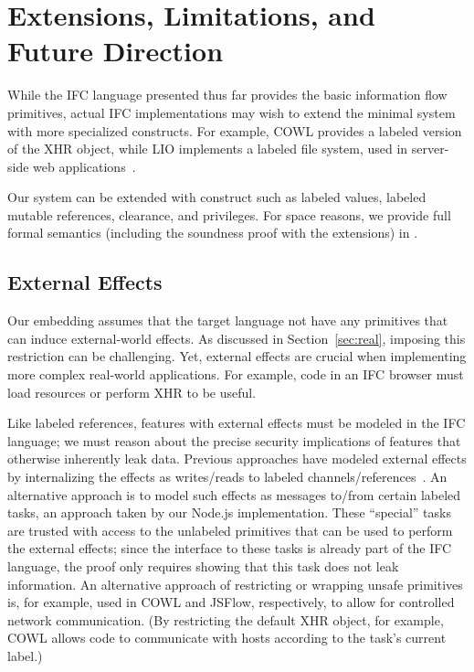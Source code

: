 
\section{Extensions, Limitations, and Future Direction}
\label{sec:extensions}
\label{sec:extensions:labeled}

While the IFC language presented thus far provides the basic
information flow primitives, actual IFC implementations
may wish to extend the minimal system with more specialized
constructs.
For example, COWL provides a labeled version of the XHR object, while
LIO implements a labeled file system, used in server-side web
applications~\cite{hails}.

Our system can be extended with construct such as labeled values,
labeled mutable references, clearance, and privileges.
For space reasons, we provide full formal semantics (including the soundness
proof with the extensions) in \appendixextfirst{}.


\subsection{External Effects}
\label{sec:extensions:external}
Our embedding assumes that the target language not have any
primitives that can induce external-world effects.
%
As discussed in Section~\ref{sec:real}, imposing this restriction
can be challenging.
%
Yet, external effects are crucial when implementing more complex
real-world applications.
%
For example, code in an IFC browser must load resources or
perform XHR to be useful.

Like labeled references, features with external effects must be
modeled in the IFC language; we must reason about the precise security
implications of features that otherwise inherently leak data.
%
Previous approaches have modeled external effects by internalizing the
effects as writes/reads to labeled channels/references~\cite{stefan:addressing-covert}.
%
An alternative approach is to model such effects as messages to/from
certain labeled tasks, an approach taken by our Node.js
implementation.
%
These ``special'' tasks are trusted with access to the unlabeled
primitives that can be used to perform the external effects; since the
interface to these tasks is already part of the IFC language, the
proof only requires showing that this task does not leak information.
%
An alternative approach of restricting or wrapping unsafe primitives
is, for example, used in COWL and JSFlow, respectively, to allow for
controlled network communication.
%
(By restricting the default XHR object, for example, COWL allows code
to communicate with hosts according to the task's current label.)
